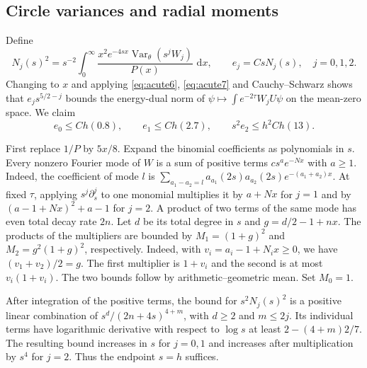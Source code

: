 \documentclass[11pt,a4paper,reqno]{amsart}
\theoremstyle{remark}
\numberwithin{equation}{section}
\newcommand{\dd}{\,\mathrm d}
\DeclareMathOperator{\Var}{Var}
\begin{document}
\subsection{Circle variances and radial moments}
Define
\[
 N_j(s)^2=s^{-2}\int_0^\infty
       \frac{x^2e^{-4sx}\Var_\theta(s^jW_j)}{P(x)}\,\dd x,\qquad
 e_j=Cs N_j(s),\quad j=0,1,2 .
\]
Changing to $x$ and applying \eqref{eq:acute6}, \eqref{eq:acute7} and
Cauchy--Schwarz shows that $e_js^{5/2-j}$ bounds the energy-dual norm
of $\psi\mapsto\int e^{-2\tau}W_jU\psi$ on the mean-zero space.
We claim
\[
 e_0\le Ch(0.8),\qquad e_1\le Ch(2.7),\qquad s^2e_2\le h^2Ch(13).
 \tag{A.8}\label{eq:acute10}
\]

First replace $1/P$ by $5x/8$. Expand the binomial coefficients as
polynomials in $s$. Every nonzero Fourier mode of $W$ is a sum of positive
terms $c s^a e^{-Nx}$ with $a\ge1$. Indeed, the coefficient of mode $l$
is $\sum_{a_1-a_2=l}a_{a_1}(2s)a_{a_2}(2s)e^{-(a_1+a_2)x}$.
At fixed $\tau$, applying $s^j\partial_s^j$ to one monomial multiplies it
by $a+Nx$ for $j=1$ and by $(a-1+Nx)^2+a-1$ for $j=2$. A product of two
terms of the same mode has even total decay rate $2n$. Let $d$ be its
total degree in $s$ and $g=d/2-1+nx$. The products of the multipliers
are bounded by $M_1=(1+g)^2$ and $M_2=g^2(1+g)^2$, respectively. Indeed,
with $v_i=a_i-1+N_ix\ge0$, we have $(v_1+v_2)/2=g$. The first multiplier
is $1+v_i$ and the second is at most $v_i(1+v_i)$. The two bounds follow
by arithmetic--geometric mean. Set $M_0=1$.

After integration of the positive terms, the bound for $s^2N_j(s)^2$
is a positive linear combination of $s^d/(2n+4s)^{4+m}$, with $d\ge2$
and $m\le2j$. Its individual terms have logarithmic derivative with
respect to $\log s$ at least $2-(4+m)2/7$. The resulting bound increases
in $s$ for $j=0,1$ and increases after multiplication by $s^4$ for $j=2$.
Thus the endpoint $s=h$ suffices.
\end{document}

